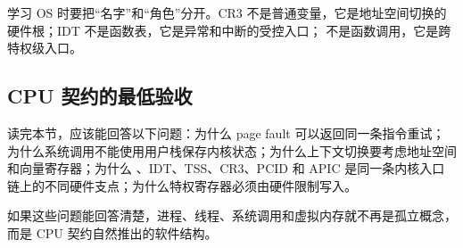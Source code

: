 学习 OS 时要把“名字”和“角色”分开。CR3 不是普通变量，它是地址空间切换的硬件根；IDT 不是函数表，它是异常和中断的受控入口； 不是函数调用，它是跨特权级入口。

\subsection{CPU 契约的最低验收}

读完本节，应该能回答以下问题：为什么 page fault 可以返回同一条指令重试；为什么系统调用不能使用用户栈保存内核状态；为什么上下文切换要考虑地址空间和向量寄存器；为什么 、IDT、TSS、CR3、PCID 和 APIC 是同一条内核入口链上的不同硬件支点；为什么特权寄存器必须由硬件限制写入。

如果这些问题能回答清楚，进程、线程、系统调用和虚拟内存就不再是孤立概念，而是 CPU 契约自然推出的软件结构。
